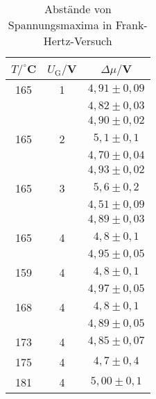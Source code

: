 \begin{table}[h]
    \centering
    \begin{tabular}{c c c}
      \toprule
      $T/^\circ$C & $U_\mathrm{G}/$V & $\Delta \mu/$V\\
      \midrule
      165&1&$4,91\pm 0,09$\\
      &&$4,82\pm 0,03$\\
      &&$4,90 \pm 0,02$\\
      165&2&$5,1 \pm 0,1$\\
      &&$4,70 \pm 0,04$\\
      &&$4,93 \pm 0,02$\\
      165&3&$5,6 \pm 0,2$\\
      &&$4,51 \pm 0,09$\\
      &&$4,89 \pm 0,03$\\
      165&4&$4,8 \pm 0,1$\\
      &&$4,95 \pm 0,05$\\
      159&4&$4,8 \pm 0,1$\\
      &&$4,97 \pm 0,05$\\
      168&4&$4,8 \pm 0,1$\\
      &&$4,89 \pm 0,05$\\
      173&4&$4,85 \pm 0,07$\\
      175&4&$4,7 \pm 0,4$\\
      181&4&$5,00\pm 0,1$\\
      \bottomrule
    \end{tabular}
    \caption{Abstände von Spannungsmaxima in Frank-Hertz-Versuch}
    \label{tab:fh_dist}
  \end{table}
